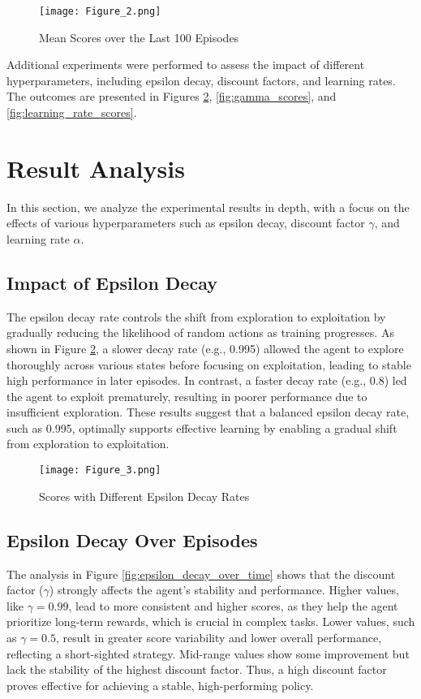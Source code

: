 \documentclass[conference]{IEEEtran}
\begin{document}
\begin{figure}[h]
    \centering
    \texttt{[image: Figure\_2.png]}
    \centering
    \caption{Mean Scores over the Last 100 Episodes}
    \label{fig:mean_scores}
\end{figure}


Additional experiments were performed to assess the impact of different hyperparameters, including epsilon decay, discount factors, and learning rates. The outcomes are presented in Figures \ref{fig:epsilon_decay_scores}, \ref{fig:gamma_scores}, and \ref{fig:learning_rate_scores}. 

\section{Result Analysis}

In this section, we analyze the experimental results in depth, with a focus on the effects of various hyperparameters such as epsilon decay, discount factor $\gamma$, and learning rate $\alpha$. 

\subsection{Impact of Epsilon Decay}

The epsilon decay rate controls the shift from exploration to exploitation by gradually reducing the likelihood of random actions as training progresses. As shown in Figure \ref{fig:epsilon_decay_scores}, a slower decay rate (e.g., 0.995) allowed the agent to explore thoroughly across various states before focusing on exploitation, leading to stable high performance in later episodes. In contrast, a faster decay rate (e.g., 0.8) led the agent to exploit prematurely, resulting in poorer performance due to insufficient exploration. These results suggest that a balanced epsilon decay rate, such as 0.995, optimally supports effective learning by enabling a gradual shift from exploration to exploitation.

\begin{figure}[h]
    \centering
    \texttt{[image: Figure\_3.png]}
    \caption{Scores with Different Epsilon Decay Rates}
    \label{fig:epsilon_decay_scores}
\end{figure}

\subsection{Epsilon Decay Over Episodes}
The analysis in Figure \ref{fig:epsilon_decay_over_time} shows that the discount factor ($\gamma$) strongly affects the agent's stability and performance. Higher values, like $\gamma = 0.99$, lead to more consistent and higher scores, as they help the agent prioritize long-term rewards, which is crucial in complex tasks. Lower values, such as $\gamma = 0.5$, result in greater score variability and lower overall performance, reflecting a short-sighted strategy. Mid-range values show some improvement but lack the stability of the highest discount factor. Thus, a high discount factor proves effective for achieving a stable, high-performing policy.
\end{document}
